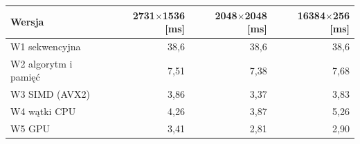 \begin{tabular}{lrrr}
\toprule
Wersja & 2731$\times$1536 [ms] & 2048$\times$2048 [ms] & 16384$\times$256 [ms] \\
\midrule
W1 sekwencyjna & 38,6 & 38,6 & 38,6 \\
W2 algorytm i pamięć & 7,51 & 7,38 & 7,68 \\
W3 SIMD (AVX2) & 3,86 & 3,37 & 3,83 \\
W4 wątki CPU & 4,26 & 3,87 & 5,26 \\
W5 GPU & 3,41 & 2,81 & 2,90 \\
\bottomrule
\end{tabular}
